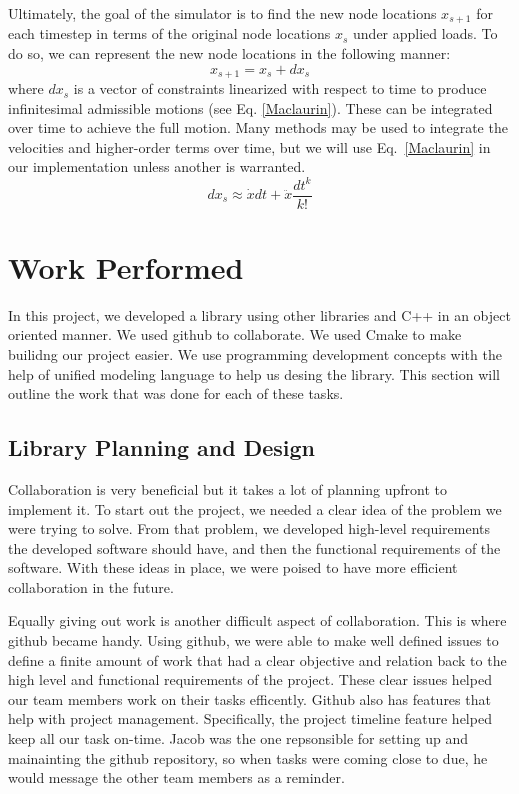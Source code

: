 \documentclass[letterpaper]{article}
\begin{document}
Ultimately, the goal of the simulator is to find the new node locations $x_{s+1}$ for each timestep in terms of the original node locations $x_s$ under applied loads. To do so, we can represent the new node locations in the following manner:
\begin{equation}
    x_{s+1}=x_s+dx_s
\end{equation}
where $dx_s$ is a vector of constraints linearized with respect to time to produce infinitesimal admissible motions (see Eq. \ref{Maclaurin}). These can be integrated over time to achieve the full motion. Many methods may be used to integrate the velocities and higher-order terms over time, but we will use Eq.~\ref{Maclaurin} in our implementation unless another is warranted.
\begin{equation}
    dx_s\approx \dot{x}dt+\ddot{x} \frac{dt^k}{k!}
    \label{Maclaurin}
\end{equation}

\section*{Work Performed}
In this project, we developed a library using other libraries and C++ in an object oriented manner. We used github to collaborate. We used Cmake to make builidng our project easier. We use programming development concepts with the help of unified modeling language to help us desing the library. This section will outline the work that was done for each of these tasks.

\subsection*{Library Planning and Design}
Collaboration is very beneficial but it takes a lot of planning upfront to implement it. To start out the project, we needed a clear idea of the problem we were trying to solve. From that problem, we developed high-level requirements the developed software should have, and then the functional requirements of the software. With these ideas in place, we were poised to have more efficient collaboration in the future. 

Equally giving out work is another difficult aspect of collaboration. This is where github became handy. Using github, we were able to make well defined issues to define a finite amount of work that had a clear objective and relation back to the high level and functional requirements of the project. These clear issues helped our team members work on their tasks efficently. Github also has features that help with project management. Specifically, the project timeline feature helped keep all our task on-time. Jacob was the one repsonsible for setting up and mainainting the github repository, so when tasks were coming close to due, he would message the other team members as a reminder. 
\end{document}
